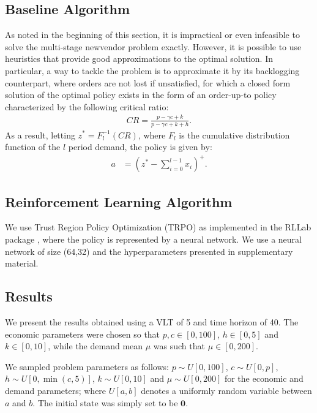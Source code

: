 \documentclass[letterpaper]{article} %
\begin{document}
\subsection{Baseline Algorithm} 

As noted in the beginning of this section, it is impractical or even infeasible to solve the multi-stage newvendor problem exactly. However, it is possible to use heuristics that provide good approximations to the optimal solution. In particular, a way to tackle the problem is to approximate it by its backlogging counterpart, where orders are not lost if unsatisfied, for which a closed form solution of the optimal policy exists in the form of an order-up-to policy characterized by the following critical ratio:
\begin{align*}
CR = \frac{p-\gamma c + k}{p-\gamma c + k + h}.
\end{align*}
As a result, letting $z^* = F_l^{-1}(CR)$, where $F_l$ is the cumulative distribution  function of the $l$ period demand, the policy is given by:
\begin{align*}
a&= \left(z^* - \sum_{i=0}^{l-1} x_i\right)^+.
\end{align*}


\subsection{Reinforcement Learning Algorithm} 

We use Trust Region Policy Optimization (TRPO) \cite{schulman2015trust} as implemented in the RLLab package \cite{rllab}, where the policy is represented by a neural network. We use a neural network of size (64,32) and the hyperparameters presented in supplementary material. %


\subsection{Results}

We present the results obtained using a VLT of 5 and time horizon of 40. The economic parameters were chosen so that $p,c\in[0,100]$, $h\in[0,5]$ and $k\in[0,10]$, while the demand mean $\mu$ was such that $\mu\in[0,200]$.

We sampled problem parameters as follows: $p\sim U[0,100]$, $c\sim U[0,p]$, $h\sim U[0,\min(c, 5)]$, $k\sim U[0,10]$ and $\mu\sim U[0,200]$ for the economic and demand parameters; where $U[a,b]$ denotes a uniformly random variable between $a$ and $b$.  The initial state was simply set to be $\mathbf{0}$.
\end{document}
